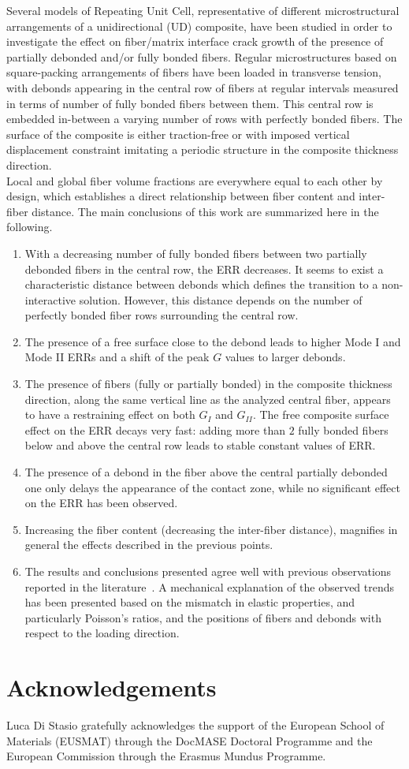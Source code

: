 \documentclass[review]{elsarticle}
\begin{document}
Several models of Repeating Unit Cell, representative of different microstructural arrangements of a unidirectional (UD) composite, have been studied in order to investigate the effect on fiber/matrix interface crack growth of the presence of partially debonded and/or fully bonded fibers. Regular microstructures based on square-packing arrangements of fibers have been loaded in transverse tension, with debonds appearing in the central row of fibers at regular intervals measured in terms of number of fully bonded fibers between them. This central row is embedded in-between a varying number of rows with perfectly bonded fibers. The surface of the composite is either traction-free or with imposed vertical displacement constraint imitating a periodic structure in the composite thickness direction.\\
Local and global fiber volume fractions are everywhere equal to each other by design, which establishes a direct relationship between fiber content and inter-fiber distance. The main conclusions of this work are summarized here in the following.
\begin{enumerate}
\item With a decreasing number of fully bonded fibers between two partially debonded fibers in the central row, the ERR decreases. It seems to exist a characteristic distance between debonds which defines the transition to a non-interactive solution. However, this distance depends on the number of perfectly bonded fiber rows surrounding the central row. 
\item The presence of a free surface close to the debond leads to higher Mode I and Mode II ERRs and a shift of the peak $G$ values to larger debonds.
\item The presence of fibers (fully or partially bonded) in the composite thickness direction, along the same vertical line as the analyzed central fiber, appears to have a restraining effect on both $G_{I}$ and $G_{II}$. The free composite surface effect on the ERR decays very fast: adding more than $2$ fully bonded fibers below and above the central row leads to stable constant values of ERR.
\item The presence of a debond in the fiber above the central partially debonded one only delays the appearance of the contact zone, while no significant effect on the ERR has been observed.
\item Increasing the fiber content (decreasing the inter-fiber distance), magnifies in general the effects described in the previous points.
\item The results and conclusions presented agree well with previous observations reported in the literature~\cite{Sandino2016,Zhuang2018}. A mechanical explanation of the observed trends has been presented based on the mismatch in elastic properties, and particularly Poisson's ratios, and the positions of fibers and debonds with respect to the loading direction. 
\end{enumerate} 

\section*{Acknowledgements}

Luca Di Stasio gratefully acknowledges the support of the European School of Materials (EUSMAT) through the DocMASE Doctoral Programme and the European Commission through the Erasmus Mundus Programme.


\end{document}
